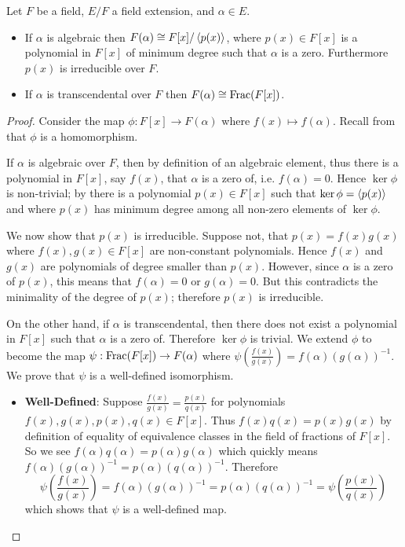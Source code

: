\begin{theorem}\label{thrm-characterisation-of-extensions}
    Let $F$ be a field, $E/F$ a field extension, and $\alpha \in E$.
    \begin{itemize}
        \item If $\alpha$ is algebraic then $F(\alpha) \cong F[x]/\left\langle p(x)\right\rangle$, where $p(x) \in F[x]$ is a polynomial in $F[x]$ of minimum degree such that $\alpha$ is a zero. Furthermore $p(x)$ is irreducible over $F$.
        \item If $\alpha$ is transcendental over $F$ then $F(\alpha) \cong \mathrm{Frac}(F[x])$.
    \end{itemize}
\end{theorem}
\begin{proof}
    Consider the map $\phi: F[x] \to F(\alpha)$ where $f(x) \mapsto f(\alpha)$. Recall from  that $\phi$ is a homomorphism.

    If $\alpha$ is algebraic over $F$, then by definition of an algebraic element, thus there is a polynomial in $F[x]$, say $f(x)$, that $\alpha$ is a zero of, i.e. $f(\alpha) = 0$. Hence $\ker\phi$ is non-trivial; by  there is a polynomial $p(x) \in F[x]$ such that $\ker\phi = \left\langle p(x)\right\rangle$ and where $p(x)$ has minimum degree among all non-zero elements of $\ker\phi$.

    We now show that $p(x)$ is irreducible. Suppose not, that $p(x) = f(x)g(x)$ where $f(x), g(x) \in F[x]$ are non-constant polynomials. Hence $f(x)$ and $g(x)$ are polynomials of degree smaller than $p(x)$. However, since $\alpha$ is a zero of $p(x)$, this means that $f(\alpha) = 0$ or $g(\alpha) = 0$. But this contradicts the minimality of the degree of $p(x)$; therefore $p(x)$ is irreducible.

    On the other hand, if $\alpha$ is transcendental, then there does not exist a polynomial in $F[x]$ such that $\alpha$ is a zero of. Therefore $\ker\phi$ is trivial. We extend $\phi$ to become the map $\psi: \mathrm{Frac}(F[x]) \to F(\alpha)$ where $\psi\left(\frac{f(x)}{g(x)}\right) = f(\alpha)(g(\alpha))^{-1}$. We prove that $\psi$ is a well-defined isomorphism.
    \begin{itemize}
        \item \textbf{Well-Defined}: Suppose $\frac{f(x)}{g(x)} = \frac{p(x)}{q(x)}$ for polynomials $f(x), g(x), p(x), q(x) \in F[x]$. Thus $f(x)q(x) = p(x)g(x)$ by definition of equality of equivalence classes in the field of fractions of $F[x]$. So we see $f(\alpha)q(\alpha) = p(\alpha)g(\alpha)$ which quickly means $f(\alpha)(g(\alpha))^{-1} = p(\alpha)(q(\alpha))^{-1}$. Therefore
        \[
            \psi\left(\frac{f(x)}{g(x)}\right) = f(\alpha)(g(\alpha))^{-1} = p(\alpha)(q(\alpha))^{-1} = \psi\left(\frac{p(x)}{q(x)}\right)
        \]
        which shows that $\psi$ is a well-defined map.


\end{itemize}
\end{proof}
